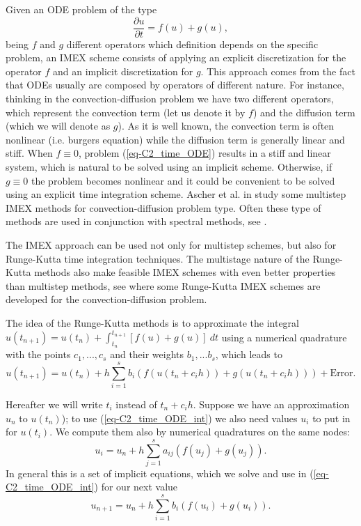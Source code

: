 Given an ODE problem of the type
\begin{equation}
\label{eq-C2_time_ODE}
\frac{\partial u}{\partial t}=f(u)+g(u), 
\end{equation}
being $f$ and $g$ different operators which definition depends on the specific problem, an IMEX scheme consists of applying an explicit discretization for the operator $f$ and an implicit discretization for $g$. This approach comes from the fact that ODEs usually are composed by operators of different nature. For instance, thinking in the convection-diffusion problem we have two different operators, which represent the convection term (let us denote it by $f$) and the diffusion term (which we will denote as $g$). As it is well known, the convection term is often nonlinear (i.e. burgers equation) while the diffusion term is generally linear and stiff. When $f\equiv0$, problem (\ref{eq-C2_time_ODE}) results in a stiff and linear system, which is natural to be solved using an implicit scheme. Otherwise, if $g\equiv0$ the problem becomes nonlinear and it could be convenient to be solved using an explicit time integration scheme. Ascher et al. in \cite{ascher_implicit-explicit_1995} study some multistep IMEX methods for convection-diffusion problem type. Often these type of methods are used in conjunction with spectral methods, see \cite{canuto_spectral_1988, kim_application_1985}.

The IMEX approach can be used not only for multistep schemes, but also for Runge-Kutta time integration techniques. The multistage nature of the Runge-Kutta methods also make feasible IMEX schemes with even better properties than multistep methods, see \cite{ascher_implicit-explicit_1997} where some Runge-Kutta IMEX schemes are developed for the convection-diffusion problem.

The idea of the Runge-Kutta methods is to approximate the integral $u(t_{n+1})=u(t_n)+\int_{t_n}^{t_{n+1}}\left[f(u)+g(u)\right]\ dt$ using a numerical quadrature with the points $c_1,...,c_s$ and their weights $b_1,...b_s$, which leads to
\begin{equation}
\label{eq-C2_time_ODE_int}
u(t_{n+1})=u(t_n)+h\sum_{i=1}^sb_i\left(f(u(t_n+c_ih))+g(u(t_n+c_ih))\right)+\mbox{Error}.
\end{equation}

Hereafter we will write $t_i$ instead of $t_n+c_ih$. Suppose we have an approximation $u_n$ to $u(t_n)$); to use (\ref{eq-C2_time_ODE_int}) we also need values $u_i$ to put in for $u(t_i)$. We compute them also by numerical quadratures on the same nodes:
\begin{equation}
\label{eq-C2_time_RK_i}
u_i=u_n+h\sum_{j=1}^sa_{ij}\left(f(u_j)+g(u_j)\right).
\end{equation}
In general this is a set of implicit equations, which we solve and use in (\ref{eq-C2_time_ODE_int}) for our next value
\begin{equation}
\label{eq-C2_time_RK_n+1}
u_{n+1}=u_n+h\sum_{i=1}^sb_i\left(f(u_i)+g(u_i)\right).
\end{equation}


